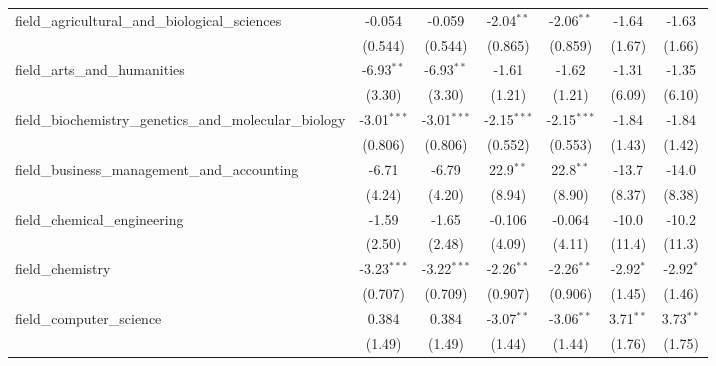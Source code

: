 \begin{tabular}{lcccccc}
   field\_agricultural\_and\_biological\_sciences              & -0.054        & -0.059        & -2.04$^{**}$  & -2.06$^{**}$  & -1.64         & -1.63\\   
                                                               & (0.544)       & (0.544)       & (0.865)       & (0.859)       & (1.67)        & (1.66)\\   
   field\_arts\_and\_humanities                                & -6.93$^{**}$  & -6.93$^{**}$  & -1.61         & -1.62         & -1.31         & -1.35\\   
                                                               & (3.30)        & (3.30)        & (1.21)        & (1.21)        & (6.09)        & (6.10)\\   
   field\_biochemistry\_genetics\_and\_molecular\_biology      & -3.01$^{***}$ & -3.01$^{***}$ & -2.15$^{***}$ & -2.15$^{***}$ & -1.84         & -1.84\\   
                                                               & (0.806)       & (0.806)       & (0.552)       & (0.553)       & (1.43)        & (1.42)\\   
   field\_business\_management\_and\_accounting                & -6.71         & -6.79         & 22.9$^{**}$   & 22.8$^{**}$   & -13.7         & -14.0\\   
                                                               & (4.24)        & (4.20)        & (8.94)        & (8.90)        & (8.37)        & (8.38)\\   
   field\_chemical\_engineering                                & -1.59         & -1.65         & -0.106        & -0.064        & -10.0         & -10.2\\   
                                                               & (2.50)        & (2.48)        & (4.09)        & (4.11)        & (11.4)        & (11.3)\\   
   field\_chemistry                                            & -3.23$^{***}$ & -3.22$^{***}$ & -2.26$^{**}$  & -2.26$^{**}$  & -2.92$^{*}$   & -2.92$^{*}$\\   
                                                               & (0.707)       & (0.709)       & (0.907)       & (0.906)       & (1.45)        & (1.46)\\   
   field\_computer\_science                                    & 0.384         & 0.384         & -3.07$^{**}$  & -3.06$^{**}$  & 3.71$^{**}$   & 3.73$^{**}$\\   
                                                               & (1.49)        & (1.49)        & (1.44)        & (1.44)        & (1.76)        & (1.75)\\   

\end{tabular}
